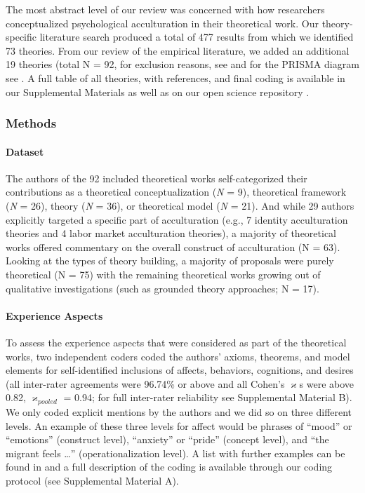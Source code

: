 The most abstract level of our review was concerned with how researchers
conceptualized psychological acculturation in their theoretical work.
Our theory-specific literature search produced a total of 477 results
from which we identified 73 theories. From our review of the empirical
literature, we added an additional 19 theories (total N = 92, for
exclusion reasons, see  and for the
PRISMA diagram see . A full table of all
theories, with references, and final coding is available in our
Supplemental Materials as well as on our open science repository
\citep[see][]{Kreienkamp2021d, Kreienkamp2021e}.



\subsubsection{Methods}
\paragraph{Dataset}

The authors of the 92 included theoretical works self-categorized their
contributions as a theoretical conceptualization (\textit{N} = 9),
theoretical framework (\textit{N} = 26), theory (\textit{N} = 36), or
theoretical model (\textit{N} = 21). And while 29 authors explicitly
targeted a specific part of acculturation (e.g., 7 identity
acculturation theories and 4 labor market acculturation theories), a
majority of theoretical works offered commentary on the overall
construct of acculturation (N = 63). Looking at the types of theory
building, a majority of proposals were purely theoretical (N = 75) with
the remaining theoretical works growing out of qualitative
investigations (such as grounded theory approaches; N = 17).

\paragraph{Experience Aspects}

To assess the experience aspects that were considered as part of the
theoretical works, two independent coders coded the authors' axioms,
theorems, and model elements for self-identified inclusions of affects,
behaviors, cognitions, and desires (all inter-rater agreements were
96.74\% or above and all Cohen's \(\varkappa\)s were above 0.82,
\(\varkappa_{pooled}\) = 0.94; for full inter-rater reliability see
Supplemental Material B). We only coded explicit mentions by the authors
and we did so on three different levels. An example of these three
levels for affect would be phrases of ``mood'' or ``emotions''
(construct level), ``anxiety'' or ``pride'' (concept level), and ``the
migrant feels \ldots{}'' (operationalization level). A list with further
examples can be found in  and a full
description of the coding is available through our coding protocol (see
Supplemental Material A).

